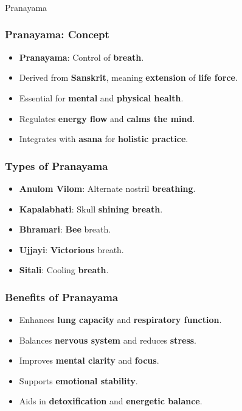 \begin{frame}[fragile]\frametitle{}
\begin{center}
{\Large Pranayama}
\end{center}
\end{frame}

\begin{frame}[fragile]\frametitle{Pranayama: Concept}

      \begin{itemize}
        \item \textbf{Pranayama}: Control of \textbf{breath}.
        \item Derived from \textbf{Sanskrit}, meaning \textbf{extension} of \textbf{life force}.
        \item Essential for \textbf{mental} and \textbf{physical health}.
        \item Regulates \textbf{energy flow} and \textbf{calms the mind}.
        \item Integrates with \textbf{asana} for \textbf{holistic practice}.
      \end{itemize}

\end{frame}

\begin{frame}[fragile]\frametitle{Types of Pranayama}

      \begin{itemize}
        \item \textbf{Anulom Vilom}: Alternate nostril \textbf{breathing}.
        \item \textbf{Kapalabhati}: Skull \textbf{shining breath}.
        \item \textbf{Bhramari}: \textbf{Bee} breath.
        \item \textbf{Ujjayi}: \textbf{Victorious} breath.
        \item \textbf{Sitali}: Cooling \textbf{breath}.
      \end{itemize}

\end{frame}

\begin{frame}[fragile]\frametitle{Benefits of Pranayama}
      \begin{itemize}
        \item Enhances \textbf{lung capacity} and \textbf{respiratory function}.
        \item Balances \textbf{nervous system} and reduces \textbf{stress}.
        \item Improves \textbf{mental clarity} and \textbf{focus}.
        \item Supports \textbf{emotional stability}.
        \item Aids in \textbf{detoxification} and \textbf{energetic balance}.
      \end{itemize}

\end{frame}

